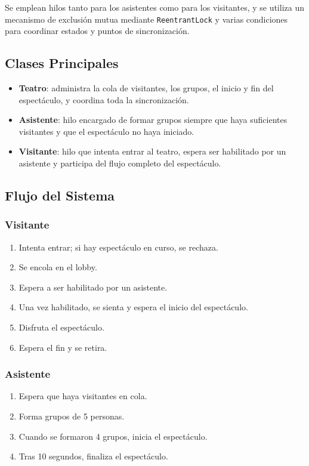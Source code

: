 \documentclass[12pt,a4paper]{article}
\begin{document}
Se emplean hilos tanto para los asistentes como para los visitantes, y se utiliza un mecanismo de exclusión mutua mediante \texttt{ReentrantLock} y varias condiciones para coordinar estados y puntos de sincronización.

\subsection{Clases Principales}

\begin{itemize}
    \item \textbf{Teatro}: administra la cola de visitantes, los grupos, el inicio y fin del espectáculo, y coordina toda la sincronización.
    \item \textbf{Asistente}: hilo encargado de formar grupos siempre que haya suficientes visitantes y que el espectáculo no haya iniciado.
    \item \textbf{Visitante}: hilo que intenta entrar al teatro, espera ser habilitado por un asistente y participa del flujo completo del espectáculo.
\end{itemize}



\subsection{Flujo del Sistema}

\subsubsection{Visitante}
\begin{enumerate}
    \item Intenta entrar; si hay espectáculo en curso, se rechaza.
    \item Se encola en el lobby.
    \item Espera a ser habilitado por un asistente.
    \item Una vez habilitado, se sienta y espera el inicio del espectáculo.
    \item Disfruta el espectáculo.
    \item Espera el fin y se retira.
\end{enumerate}

\subsubsection{Asistente}
\begin{enumerate}
    \item Espera que haya visitantes en cola.
    \item Forma grupos de 5 personas.
    \item Cuando se formaron 4 grupos, inicia el espectáculo.
    \item Tras 10 segundos, finaliza el espectáculo.
\end{enumerate}
\end{document}
